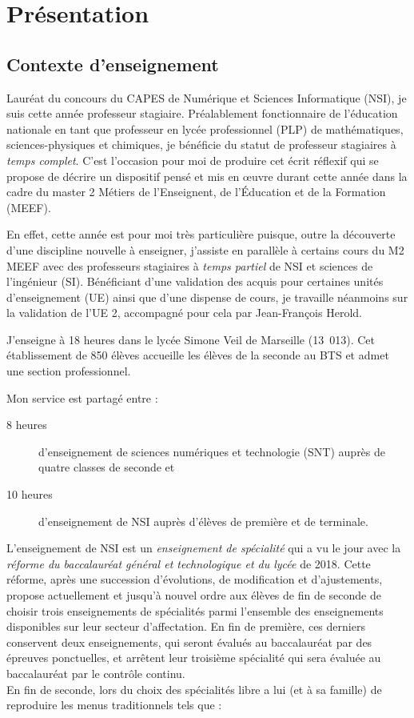 \section{Présentation}



\subsection{Contexte d'enseignement}



Lauréat du concours du CAPES de Numérique et Sciences Informatique (NSI), je suis  cette année professeur stagiaire. Préalablement fonctionnaire de l'éducation nationale en tant que professeur en lycée professionnel (PLP) de mathématiques, sciences-physiques et chimiques, je bénéficie du statut de professeur stagiaires à \emph{temps complet}. C'est l'occasion pour moi de produire cet écrit réflexif qui se propose de décrire un dispositif pensé et mis en œuvre durant cette année dans la cadre du master 2 Métiers de l'Enseignent, de l'Éducation et de la Formation (MEEF).

En effet, cette année est pour moi très particulière puisque, outre la découverte d'une discipline nouvelle à enseigner, j'assiste en parallèle à certains cours du M2 MEEF avec des professeurs stagiaires à \emph{temps partiel} de NSI et sciences de l'ingénieur (SI). Bénéficiant d'une validation des acquis pour certaines unités d'enseignement (UE) ainsi que d'une dispense de cours, je travaille néanmoins sur la validation de l'UE 2, accompagné pour cela par Jean-François Herold.

J'enseigne à 18 heures dans le lycée Simone Veil de Marseille (13~013). Cet établissement de 850 élèves accueille les élèves de la seconde au BTS et admet une section professionnel.

Mon service est partagé entre :

\begin{description}
    \item[8 heures] d'enseignement de sciences numériques et technologie (SNT) auprès de quatre classes de seconde et
    \item[10 heures] d'enseignement de NSI auprès d'élèves de première et de terminale.
\end{description}

L'enseignement de NSI est un \emph{enseignement de spécialité} qui a vu le jour avec la \emph{réforme du baccalauréat général et technologique et du lycée} de 2018. Cette réforme, après une succession d'évolutions, de modification et d'ajustements, propose actuellement et jusqu'à nouvel ordre aux élèves de fin de seconde de choisir trois enseignements de spécialités parmi l'ensemble des enseignements disponibles sur leur secteur d'affectation. En fin de première, ces derniers conservent deux enseignements, qui seront évalués au baccalauréat par des épreuves ponctuelles, et arrêtent leur troisième spécialité qui sera évaluée au baccalauréat par le contrôle continu.
\\
En fin de seconde, lors du choix des spécialités libre a lui (et à sa famille) de reproduire les menus traditionnels tels que :

